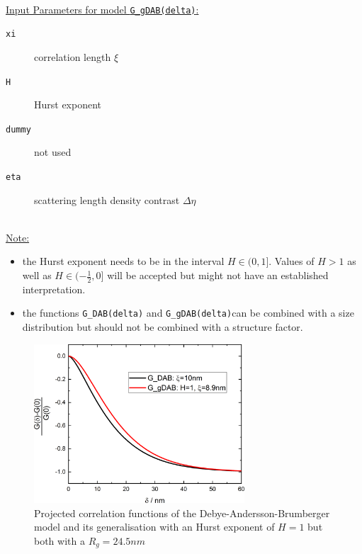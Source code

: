 \hspace{1pt}\\
\underline{Input Parameters for model \texttt{G\_gDAB(delta)}:}\\
\begin{description}
\item[\texttt{xi}] correlation length $\xi$
\item[\texttt{H}] Hurst exponent
\item[\texttt{dummy}] not used
\item[\texttt{eta}] scattering length density contrast $\Delta\eta$
\end{description}

\hspace{1pt}\\
\underline{Note:}
\begin{itemize}
\item the Hurst exponent needs to be in the interval $H \in (0,1]$. Values of $H>1$ as well as $H\in(-\frac12,0]$ will be accepted but might not have an established interpretation.
\item the functions \texttt{G\_DAB(delta)} and \texttt{G\_gDAB(delta)}can be combined with a size distribution but should not be combined with a structure factor.
\end{itemize}

\begin{figure}[htb]
\begin{center}
\includegraphics[width=0.7\textwidth]{../images/form_factor/SESANS/G_gDAB.png}
\end{center}
\caption{Projected correlation functions of the Debye-Andersson-Brumberger model and its generalisation with an Hurst exponent of $H=1$ but both with a $R_g=24.5nm$}
\label{fig:G_gDAB}
\end{figure}


